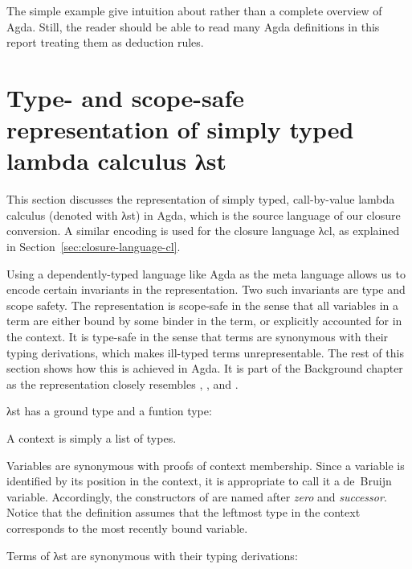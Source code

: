 \documentclass[bsc,frontabs,oneside,singlespacing,parskip,deptreport]{infthesis}
\theoremstyle{definition}
\theoremstyle{lemma}
\begin{document}
The simple example give intuition about rather than a complete
overview of Agda. Still, the reader should be able to read many Agda
definitions in this report treating them as deduction rules.

\section{Type- and scope-safe representation of simply typed lambda
  calculus λst}
\label{sec:type-scope-safe}

This section discusses the representation of simply typed,
call-by-value lambda calculus (denoted with λst) in Agda, which is the
source language of our closure conversion. A similar encoding is used
for the closure language λcl, as explained in
Section~\ref{sec:closure-language-cl}.

Using a dependently-typed language like Agda as the meta language
allows us to encode certain invariants in the representation. Two such
invariants are type and scope safety. The representation is scope-safe
in the sense that all variables in a term are either bound by some
binder in the term, or explicitly accounted for in the context. It is
type-safe in the sense that terms are synonymous with their typing
derivations, which makes ill-typed terms unrepresentable. The rest of
this section shows how this is achieved in Agda. It is part of the
Background chapter as the representation closely resembles
\cite{DBLP:conf/cpp/Allais0MM17},
\cite{DBLP:journals/pacmpl/AllaisA0MM18}, and
\cite{DBLP:conf/sbmf/Wadler18}.

λst has a ground type and a funtion type:


A context is simply a list of types.


Variables are synonymous with proofs of context membership. Since a
variable is identified by its position in the context, it is
appropriate to call it a de~Bruijn variable. Accordingly, the
constructors of  are named after \textit{zero} and
\textit{successor}. Notice that the definition assumes that the
leftmost type in the context corresponds to the most recently bound
variable.


Terms of λst are synonymous with their typing derivations:

\end{document}
